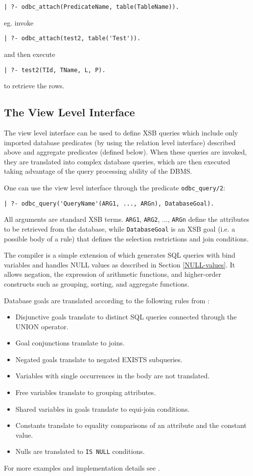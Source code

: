 \begin{verbatim}
| ?- odbc_attach(PredicateName, table(TableName)).
\end{verbatim}

eg. invoke 
\begin{verbatim}
| ?- odbc_attach(test2, table('Test')).
\end{verbatim}
and then execute 
\begin{verbatim}
| ?- test2(TId, TName, L, P).
\end{verbatim}
to retrieve the rows.

\subsection{The View Level Interface}

The view level interface can be used to define XSB queries which
include only imported database predicates (by using the relation level
interface) described above and aggregate predicates (defined below).
When these queries are invoked, they are translated into complex
database queries, which are then executed taking advantage of the
query processing ability of the DBMS.

One can use the view level interface through the predicate {\tt odbc\_query/2}:  
\begin{verbatim}
| ?- odbc_query('QueryName'(ARG1, ..., ARGn), DatabaseGoal).
\end{verbatim}
All arguments are standard XSB terms.  {\tt ARG1}, {\tt ARG2}, ...,
{\tt ARGn} define the attributes to be retrieved from the database,
while {\tt DatabaseGoal} is an XSB goal (i.e. a possible body of a
rule) that defines the selection restrictions and join conditions.

The compiler is a simple extension of \cite{Drax92} which generates SQL
queries with bind variables and handles NULL values as described in
Section \ref{NULL-values}.  It allows negation, the expression
of arithmetic functions, and higher-order constructs such as grouping,
sorting, and aggregate functions.

Database goals are translated according to the following rules
from \cite{Drax92}:
\begin{itemize}
\item Disjunctive goals translate to distinct SQL queries
        connected through the UNION operator.
\item Goal conjunctions translate to joins.
\item Negated goals translate to negated EXISTS subqueries.
\item Variables with single occurrences in the body are not
          translated.
\item Free variables translate to grouping attributes.
\item Shared variables in goals translate to equi-join conditions.
\item Constants translate to equality comparisons of an attribute and
          the constant value.
\item Nulls are translated to {\tt IS NULL} conditions.
\end{itemize}
For more examples and implementation details see \cite{Drax92}.
 
